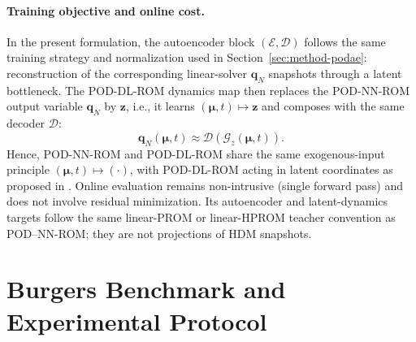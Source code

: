\documentclass[11pt]{article}
\begin{document}
\paragraph{Training objective and online cost.}
In the present formulation, the autoencoder block $(\mathcal E,\mathcal D)$ follows the
same training strategy and normalization used in
Section~\ref{sec:method-podae}: reconstruction of the corresponding
linear-solver $\mathbf q_N$ snapshots through a latent bottleneck. The POD-DL-ROM dynamics map then
replaces the POD-NN-ROM output variable $\mathbf q_N$ by $\mathbf z$, i.e., it learns
$(\bm\mu,t)\mapsto\mathbf z$ and composes with the same decoder $\mathcal D$:
\begin{equation}
\mathbf q_N(\bm\mu,t)\approx \mathcal D\!\left(\mathcal G_z(\bm\mu,t)\right).
\end{equation}
Hence, POD-NN-ROM and POD-DL-ROM share the same exogenous-input principle
$(\bm\mu,t)\mapsto(\cdot)$, with POD-DL-ROM acting in latent coordinates as proposed in
\cite{fresca2022pod}. Online evaluation remains non-intrusive (single forward pass)
and does not involve residual minimization.  Its autoencoder and latent-dynamics
targets follow the same linear-PROM or linear-HPROM teacher convention as
POD--NN-ROM; they are not projections of HDM snapshots.

\section{Burgers Benchmark and Experimental Protocol}
\label{sec:burgers}
\end{document}
